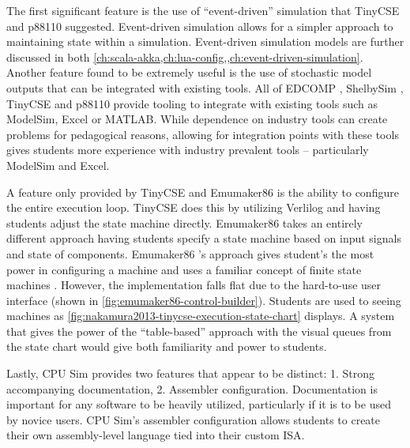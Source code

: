 The first significant feature is the use of ``event-driven'' simulation that TinyCSE \cite{Nakamura2013, McLoughlin2010} and p88110 \cite{Garcia2009} suggested. Event-driven simulation allows for a simpler approach to maintaining state within a simulation. Event-driven simulation models are further discussed in both \cref{ch:scala-akka,ch:lua-config,,ch:event-driven-simulation}. Another feature found to be extremely useful is the use of stochastic model outputs that can be integrated with existing tools. All of EDCOMP \cite{Djordjevic2005}, ShelbySim \cite{Tappan2009, Tappan2009-2}, TinyCSE \cite{Nakamura2013, McLoughlin2010} and p88110 \cite{Garcia2009} provide tooling to integrate with existing tools such as ModelSim, Excel or MATLAB. While dependence on industry tools can create problems for pedagogical reasons, allowing for integration points with these tools gives students more experience with industry prevalent tools -- particularly ModelSim and Excel. 

A feature only provided by TinyCSE \cite{Nakamura2013, McLoughlin2010} and Emumaker86 \cite{Black2013} is the ability to configure the entire execution loop. TinyCSE \cite{Nakamura2013,McLoughlin2010} does this by utilizing Verlilog and having students adjust the state machine directly. Emumaker86 \cite{Black2013} takes an entirely different approach having students specify a state machine based on input signals and state of components. Emumaker86 \cite{Black2013}'s approach gives student's the most power in configuring a machine and uses a familiar concept of finite state machines \cite{cec2016}. However, the implementation falls flat due to the hard-to-use user interface (shown in \cref{fig:emumaker86-control-builder}). Students are used to seeing machines as \cref{fig:nakamura2013-tinycse-execution-state-chart} displays. A system that gives the power of the ``table-based'' approach with the visual queues from the state chart would give both familiarity and power to students.

Lastly, CPU Sim \cite{Skrien2001} provides two features that appear to be distinct: 1. Strong accompanying documentation, 2. Assembler configuration. Documentation is important for any software to be heavily utilized, particularly if it is to be used by novice users. CPU Sim's assembler configuration allows students to create their own assembly-level language tied into their custom ISA.  

